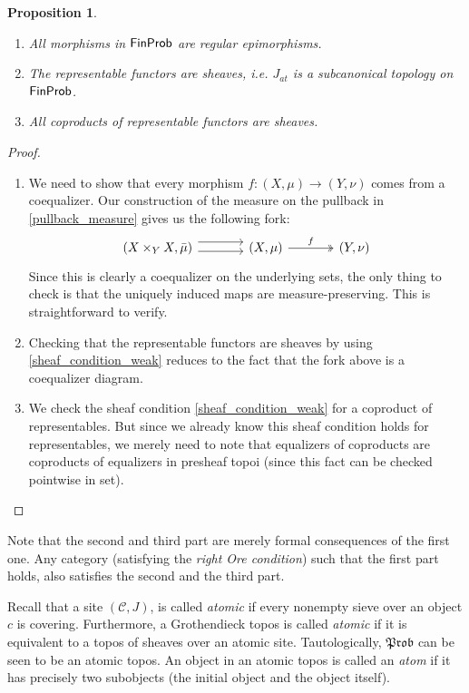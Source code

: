 \documentclass[a4paper]{amsproc}
\theoremstyle{plain}
\newtheorem{proposition}[theorem]{Proposition}
\theoremstyle{definition}
\theoremstyle{remark}
\numberwithin{equation}{section}
\newcommand{\FinProb}{\textup{\textsf{FinProb}}}
\newcommand{\C}{\mathcal{C}}
\newcommand{\Prob}{\mathfrak{Prob}}
\begin{document}
\begin{proposition}\label{subcanonical}
    \mbox{}
    \begin{enumerate}
        \item All morphisms in $\FinProb$ are regular epimorphisms.
        \item The representable functors are sheaves, i.e. $J_{at}$ is a subcanonical topology on $\FinProb$.
        \item All coproducts of representable functors are sheaves.
    \end{enumerate}
\end{proposition}
\begin{proof}
    \mbox{}
    \begin{enumerate}
        \item We need to show that every morphism $f:(X,\mu)\rightarrow (Y, \nu)$ comes from a coequalizer. Our construction of the measure on the pullback in \ref{pullback_measure} gives us the following fork:
        \[
        \begin{tikzcd}[column sep=large]
        (X \times_Y X, \bar{\mu}) \arrow[r, shift left=2] \arrow[r, shift right] & (X,\mu) \arrow[r, "f", two heads] & (Y,\nu)
        \end{tikzcd}
        \]
        Since this is clearly a coequalizer on the underlying sets, the only thing to check is that the uniquely induced maps are measure-preserving. This is straightforward to verify.

        \item Checking that the representable functors are sheaves by using \ref{sheaf_condition_weak} reduces to the fact that the fork above is a coequalizer diagram.

        \item We check the sheaf condition \ref{sheaf_condition_weak} for a coproduct of representables. But since we already know this sheaf condition holds for representables, we merely need to note that equalizers of coproducts are coproducts of equalizers in presheaf topoi (since this fact can be checked pointwise in set).
    \end{enumerate}
\end{proof}

Note that the second and third part are merely formal consequences of the first one. Any category (satisfying the \emph{right Ore condition}) such that the first part holds, also satisfies the second and the third part.

Recall that a site $(\C, J)$, is called \emph{atomic} if every nonempty sieve over an object $c$ is covering. Furthermore, a Grothendieck topos is called \emph{atomic} if it is equivalent to a topos of sheaves over an atomic site. Tautologically, $\Prob$ can be seen to be an atomic topos. An object in an atomic topos is called an \emph{atom} if it has precisely two subobjects (the initial object and the object itself).
\end{document}
